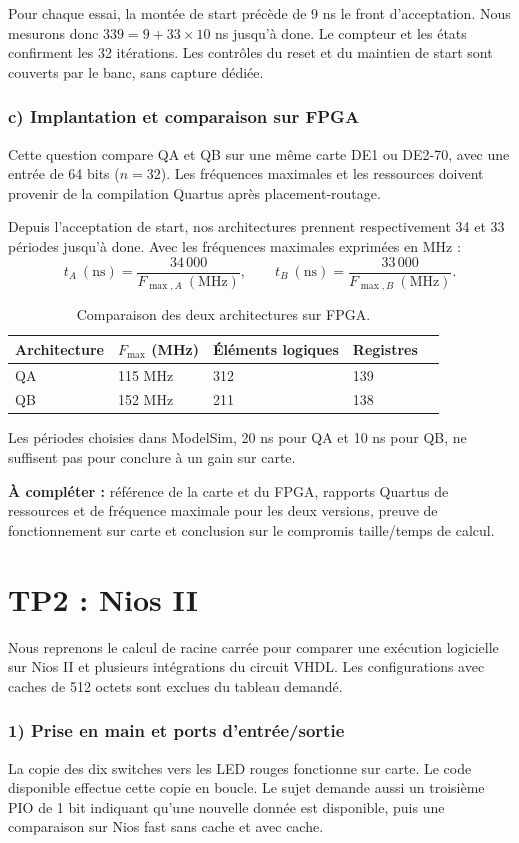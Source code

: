 \documentclass[a4paper,11pt]{article}
\begin{document}
Pour chaque essai, la montée de start précède de 9 ns le front d’acceptation. Nous mesurons donc $339=9+33\times10$ ns jusqu’à done. Le compteur et les états confirment les 32 itérations. Les contrôles du reset et du maintien de start sont couverts par le banc, sans capture dédiée.

\clearpage
\section*{c) Implantation et comparaison sur FPGA}
Cette question compare QA et QB sur une même carte DE1 ou DE2-70, avec une entrée de 64 bits ($n=32$). Les fréquences maximales et les ressources doivent provenir de la compilation Quartus après placement-routage.

Depuis l’acceptation de start, nos architectures prennent respectivement 34 et 33 périodes jusqu’à done. Avec les fréquences maximales exprimées en MHz :
\[
t_A\ \mathrm{(ns)}=\frac{34\,000}{F_{\max,A}\ \mathrm{(MHz)}},\qquad
 t_B\ \mathrm{(ns)}=\frac{33\,000}{F_{\max,B}\ \mathrm{(MHz)}}.
\]
\begin{table}[H]
\centering\small
\begin{tabularx}{\linewidth}{@{}lXXXX@{}}
\toprule
Architecture & $F_{\max}$ (MHz) & Éléments logiques & Registres \\
\midrule
QA & 115 MHz & 312 & 139 \\
QB & 152 MHz & 211 & 138 \\
\bottomrule
\end{tabularx}
\caption{Comparaison des deux architectures sur FPGA.}
\end{table}
Les périodes choisies dans ModelSim, 20 ns pour QA et 10 ns pour QB, ne suffisent pas pour conclure à un gain sur carte.

\textbf{À compléter :} référence de la carte et du FPGA, rapports Quartus de ressources et de fréquence maximale pour les deux versions, preuve de fonctionnement sur carte et conclusion sur le compromis taille/temps de calcul.

\clearpage
\part*{TP2 : Nios II}
Nous reprenons le calcul de racine carrée pour comparer une exécution logicielle sur Nios II et plusieurs intégrations du circuit VHDL. Les configurations avec caches de 512 octets sont exclues du tableau demandé.

\section*{1) Prise en main et ports d’entrée/sortie}
La copie des dix switches vers les LED rouges fonctionne sur carte. Le code disponible effectue cette copie en boucle. Le sujet demande aussi un troisième PIO de 1 bit indiquant qu’une nouvelle donnée est disponible, puis une comparaison sur Nios fast sans cache et avec cache.
\end{document}

